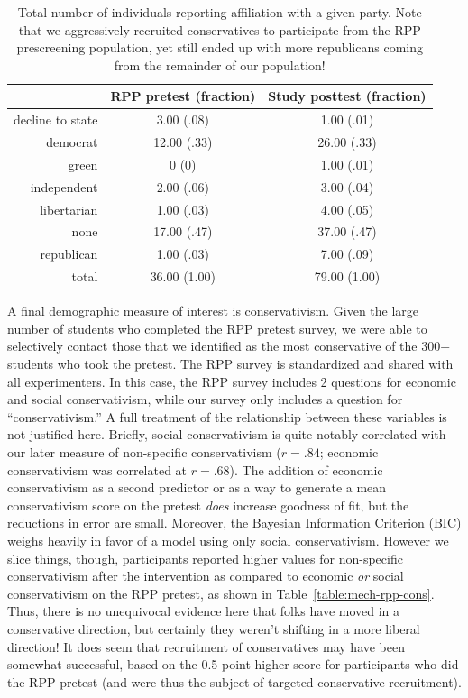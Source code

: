 \begin{table}[ht]
    \caption{Total number of individuals reporting affiliation with a given
        party. Note that we aggressively recruited conservatives to participate
        from the RPP prescreening population, yet still ended up with more
        republicans coming from the remainder of our population!}
    \label{table:mech-rpp-party-affiliations}
\centering
\begin{tabular}{rcc}
  \toprule
 & RPP pretest (fraction) & Study posttest (fraction) \\ 
  \midrule
  decline to state & 3.00 (.08) & 1.00 (.01) \\ 
  democrat & 12.00 (.33) & 26.00 (.33) \\ 
  green & 0 (0) & 1.00 (.01) \\ 
  independent & 2.00 (.06) & 3.00 (.04) \\ 
  libertarian & 1.00 (.03) & 4.00 (.05) \\ 
  none & 17.00 (.47) & 37.00 (.47) \\ 
  republican & 1.00 (.03) & 7.00 (.09) \\ 
  \midrule
  total & 36.00 (1.00) & 79.00 (1.00) \\ 
   \bottomrule
\end{tabular}
\end{table}

A final demographic measure of interest is conservativism. Given the large
number of students who completed the RPP pretest survey, we were able to
selectively contact those that we identified as the most conservative of the
300+ students who took the pretest. The RPP survey is standardized and shared
with all experimenters. In this case, the RPP survey includes 2 questions for
economic and social conservativism, while our survey only includes a question
for “conservativism.” A full treatment of the relationship between these
variables is not justified here. Briefly, social conservativism is quite
notably correlated with our later measure of non-specific conservativism ($r =
.84$; economic conservativism was correlated at $r = .68$). The addition of economic
conservativism as a second predictor or as a way to generate a mean
conservativism score on the pretest \emph{does} increase goodness of fit, but
the reductions in error are small. Moreover, the Bayesian Information Criterion
(BIC) weighs heavily in favor of a model using only social conservativism.
However we slice things, though, participants reported higher values for
non-specific conservativism after the intervention as compared to economic
\emph{or} social conservativism on the RPP pretest, as shown in
Table~\ref{table:mech-rpp-cons}. Thus, there is no unequivocal evidence here
that folks have moved in a conservative direction, but certainly they weren't
shifting in a more liberal direction! It does seem that recruitment of
conservatives may have been somewhat successful, based on the 0.5-point higher
score for participants who did the RPP pretest (and were thus the subject of
targeted conservative recruitment).

